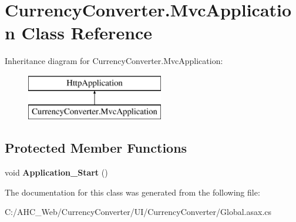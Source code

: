 \hypertarget{class_currency_converter_1_1_mvc_application}{\section{Currency\-Converter.\-Mvc\-Application Class Reference}
\label{class_currency_converter_1_1_mvc_application}
}
Inheritance diagram for Currency\-Converter.\-Mvc\-Application\-:\begin{figure}[H]
\begin{center}
\leavevmode
\includegraphics[height=2.000000cm]{class_currency_converter_1_1_mvc_application}
\end{center}
\end{figure}
\subsection*{Protected Member Functions}
\begin{DoxyCompactItemize}
\item 
\hypertarget{class_currency_converter_1_1_mvc_application_accace28d7fadb58b0469cffe139ebfcc}{void {\bfseries Application\-\_\-\-Start} ()}\label{class_currency_converter_1_1_mvc_application_accace28d7fadb58b0469cffe139ebfcc}

\end{DoxyCompactItemize}


The documentation for this class was generated from the following file\-:\begin{DoxyCompactItemize}
\item 
C\-:/\-A\-H\-C\-\_\-\-Web/\-Currency\-Converter/\-U\-I/\-Currency\-Converter/Global.\-asax.\-cs\end{DoxyCompactItemize}

